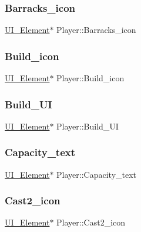 \subsubsection{\texorpdfstring{Barracks\_icon}{Barracks\_icon}}
{\footnotesize\ttfamily \mbox{\hyperlink{class_u_i___element}{U\+I\+\_\+\+Element}}$\ast$ Player\+::\+Barracks\+\_\+icon}

\mbox{\label{class_player_a516e87268fc1dc66d25c12925f50cc14}} 
\subsubsection{\texorpdfstring{Build\_icon}{Build\_icon}}
{\footnotesize\ttfamily \mbox{\hyperlink{class_u_i___element}{U\+I\+\_\+\+Element}}$\ast$ Player\+::\+Build\+\_\+icon}

\mbox{\label{class_player_ade6ba1f2e0318858c6ba37df88e407c6}} 
\subsubsection{\texorpdfstring{Build\_UI}{Build\_UI}}
{\footnotesize\ttfamily \mbox{\hyperlink{class_u_i___element}{U\+I\+\_\+\+Element}}$\ast$ Player\+::\+Build\+\_\+\+UI}

\mbox{\label{class_player_ad37b79b585d8f13ead82aaa74291b37f}} 
\subsubsection{\texorpdfstring{Capacity\_text}{Capacity\_text}}
{\footnotesize\ttfamily \mbox{\hyperlink{class_u_i___element}{U\+I\+\_\+\+Element}}$\ast$ Player\+::\+Capacity\+\_\+text}

\mbox{\label{class_player_a2ccc373449cae9b0f558b78d7f248dfb}} 
\subsubsection{\texorpdfstring{Cast2\_icon}{Cast2\_icon}}
{\footnotesize\ttfamily \mbox{\hyperlink{class_u_i___element}{U\+I\+\_\+\+Element}}$\ast$ Player\+::\+Cast2\+\_\+icon}

